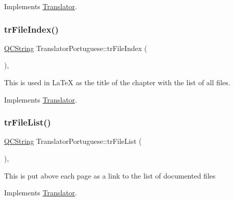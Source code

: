 Implements \mbox{\hyperlink{class_translator}{Translator}}.

\mbox{\label{class_translator_portuguese_aff686b1ff820818edce54594005bba0e}} 
\subsubsection{\texorpdfstring{trFileIndex()}{trFileIndex()}}
{\footnotesize\ttfamily \mbox{\hyperlink{class_q_c_string}{Q\+C\+String}} Translator\+Portuguese\+::tr\+File\+Index (\begin{DoxyParamCaption}{ }\end{DoxyParamCaption})\hspace{0.3cm}{\ttfamily [inline]}, {\ttfamily [virtual]}}

This is used in La\+TeX as the title of the chapter with the list of all files. 

Implements \mbox{\hyperlink{class_translator}{Translator}}.

\mbox{\label{class_translator_portuguese_a8479befda6e2ce5364297dda6d328e2e}} 
\subsubsection{\texorpdfstring{trFileList()}{trFileList()}}
{\footnotesize\ttfamily \mbox{\hyperlink{class_q_c_string}{Q\+C\+String}} Translator\+Portuguese\+::tr\+File\+List (\begin{DoxyParamCaption}{ }\end{DoxyParamCaption})\hspace{0.3cm}{\ttfamily [inline]}, {\ttfamily [virtual]}}

This is put above each page as a link to the list of documented files 

Implements \mbox{\hyperlink{class_translator}{Translator}}.

\mbox{\label{class_translator_portuguese_a837813311f9a4dbc0f7ec4aa9d1b8f24}} 
